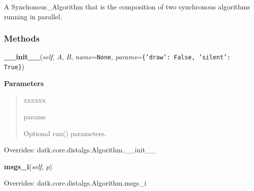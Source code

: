 A Synchonous\_Algorithm that is the composition of two synchronous 
algorithms running in parallel.



  \subsubsection{Methods}

    \vspace{0.5ex}

\hspace{.8\funcindent}\begin{boxedminipage}{\funcwidth}

    \raggedright \textbf{\_\_init\_\_}(\textit{self}, \textit{A}, \textit{B}, \textit{name}={\tt None}, \textit{params}={\tt \texttt{\{}\texttt{'}\texttt{draw}\texttt{'}\texttt{: }False\texttt{, }\texttt{'}\texttt{silent}\texttt{'}\texttt{: }True\texttt{\}}})

\setlength{\parskip}{2ex}
\setlength{\parskip}{1ex}
      \textbf{Parameters}
      \vspace{-1ex}

      \begin{quote}
        \begin{Ventry}{xxxxxx}

          \item[params]

          Optional run() parameters.

        \end{Ventry}

      \end{quote}

      Overrides: datk.core.distalgs.Algorithm.\_\_init\_\_

    \end{boxedminipage}

    \vspace{0.5ex}

\hspace{.8\funcindent}\begin{boxedminipage}{\funcwidth}

    \raggedright \textbf{msgs\_i}(\textit{self}, \textit{p})

\setlength{\parskip}{2ex}
\setlength{\parskip}{1ex}
      Overrides: datk.core.distalgs.Algorithm.msgs\_i

    \end{boxedminipage}

